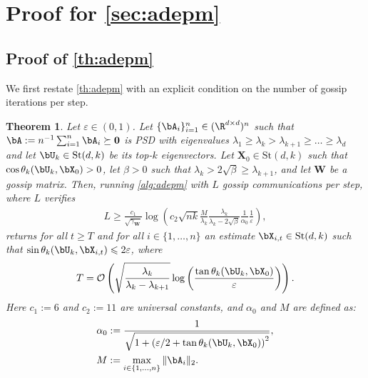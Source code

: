 \documentclass{article}
\theoremstyle{plain}
\newtheorem{theorem}{Theorem}[section]
\theoremstyle{definition}
\theoremstyle{remark}
\begin{document}
\section{Proof for \cref{sec:adepm}}\label{apdx:adepm_proof}

\subsection{Proof of \cref{th:adepm}}

We first restate \cref{th:adepm} with an explicit condition on the number of gossip iterations per step.

\begin{theorem}\label{th:adepm_apdx}
  Let $\varepsilon \in (0,1)$. Let $\{\bA_i\}_{i=1}^n \in (\R^{d \times d})^n$ such that $\bA := n^{-1}\sum_{i=1}^n \bA_i \succeq \mathbf{0}$ is PSD with eigenvalues $\lambda_1 \geqslant \lambda_k > \lambda_{k+1} \geqslant \dots \geqslant \lambda_d$ and let $\bU_k \in \mathrm{St}(d,k)$ be its top-$k$ eigenvectors. Let $\mathbf{X}_0 \in \mathrm{St}(d,k)$ such that $\cos\theta_k(\bU_k,\bX_0) > 0$, let $\beta > 0$ such that $\lambda_k > 2\sqrt{\beta} \geqslant \lambda_{k+1}$, and let $\mathbf{W}$ be a gossip matrix. Then, running \cref{alg:adepm} with $L$ gossip communications per step, where $L$ verifies 
  \begin{align}\label{eq:L_condition}
    L \geqslant \frac{c_1}{\sqrt{\gamma_\mathbf{W}}} \log\left(c_2\sqrt{nk}\frac{M}{\lambda_k}\frac{\lambda_k}{\lambda_k - 2\sqrt{\beta}}\frac{1}{\alpha_0}\frac{1}{\varepsilon}\right),
  \end{align}
  returns for all $t\geqslant T$ and for all $i\in \{1, \dots, n\}$ an estimate $\bX_{i,t} \in \mathrm{St}(d,k)$ such that $\sin \theta_k(\bU_k, \bX_{i,t}) \leqslant 2\varepsilon$, where
  \begin{align*}
    T = \mathcal{O}\left(\sqrt{\frac{\lambda_k}{\lambda_k - \lambda_{k+1}}} \log\left(\frac{\tan \theta_k(\bU_k, \bX_0)}{\varepsilon}\right)\right).
  \end{align*}
  Here $c_1 := 6$ and $c_2 := 11$ are universal constants, and $\alpha_0$ and $M$ are defined as:
  \begin{align*}
    & \alpha_0 := \frac{1}{\sqrt{1 + \left(\varepsilon/2 + \tan\theta_k(\bU_k,\bX_0)\right)^2}},\\
    & M := \max_{i\in \{1, \dots, n\}} \Vert \bA_i \Vert_2.
  \end{align*}
\end{theorem}
\end{document}
